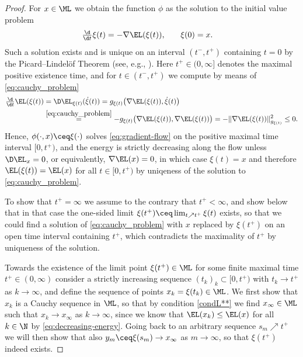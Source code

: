 \begin{proof}
	For $x\in\ML$ we obtain
	the function $\phi$ as the solution to the 
	initial value problem
	\begin{equation} 
		\begin{aligned}
			\label{eq:cauchy_problem}
		\textstyle
		\frac{\d}{\d t}\xi(t) &=-\nabla \EL(\xi(t)), &\hspace{10pt}\xi(0)&=x.
		\end{aligned}
	\end{equation}
	Such a solution exists and is unique on an 
	interval $(t^-,t^{+})$ containing $t=0$
	by the Picard--Lindelöf Theorem 
	(see, e.g., \cite[Chapter IV.2]{lang_2002}). 
	Here $t^{+}\in (0,\infty]$ 
	denotes the maximal positive existence time, 
	and for $t\in (t^-,t^+)$ we compute by means of 
	\cref{eq:cauchy_problem}
	\begin{align}
	\textstyle
	\frac{\d}{\d t}\EL(\xi(t)) &
=\D\EL_{\xi(t)}(\dot{\xi}(t))= g_{\xi(t)}\big(\nabla \EL(\xi(t)),
	\dot{\xi}(t)\big)\label{eq:decreasing-energy}\\
		&\overset{\cref{eq:cauchy_problem}}{=}  
- g_{\xi(t)}\big(\nabla \EL(\xi(t)),\nabla \EL(\xi(t))\big)
=-\|\nabla\EL(\xi(t))\|^2_{g_{\xi(t)}}\le 0.\notag
	\end{align}
Hence, $\phi(\cdot,x) \ceq \xi(\cdot)$ 
solves 
\cref{eq:gradient-flow} on the positive maximal time interval $[0,t^+)$, 
and the energy is strictly decreasing along the flow unless $\D\EL_x=0$,
or equivalently, $\nabla\EL(x)=0$, in which case $\xi(t)=x$ and therefore
$\EL(\xi(t))=\EL(x)$ for all $t\in
[0,t^+)$ by uniqeness of the solution to \cref{eq:cauchy_problem}.

To show that $t^+=\infty$ we assume to the contrary that $t^+<\infty$,
and show below
that in that case the one-sided limit
$\xi(t^+) \ceq \lim_{t\nearrow t^+}\xi(t)$ exists, so that 
we could find a solution of \cref{eq:cauchy_problem} with $x$ replaced
by $\xi(t^+)$ on an
open
 time interval containing $t^+$, which contradicts the 
maximality of $t^+$ by uniqueness of the solution.

Towards the existence of the limit point
$\xi(t^+)\in\ML$ for some finite maximal time $t^+\in
	(0,\infty)$
consider 
a strictly increasing
sequence $(t_k)_k\subset[0,t^+)$ with $t_k\to t^+$ as $k\to\infty$,
and define 
the sequence of points
$x_k=\xi(t_k)\in\ML$. We first show that $x_k$ is a Cauchy 
sequence in $\ML$, so that by condition
\ref{condL**} we find $x_\infty\in\ML$ such that $x_k\to x_\infty$ as
$k\to\infty$, since we know  that
$\EL(x_k)\le\EL(x)$ for all $k\in\N$ by \cref{eq:decreasing-energy}. Going back
to an arbitrary sequence $s_m\nearrow t^+$ we will then show that also 
$y_m \ceq \xi(s_m)\to x_\infty$ as $m\to\infty$, so that $\xi(t^+)$ indeed exists.


\end{proof}
